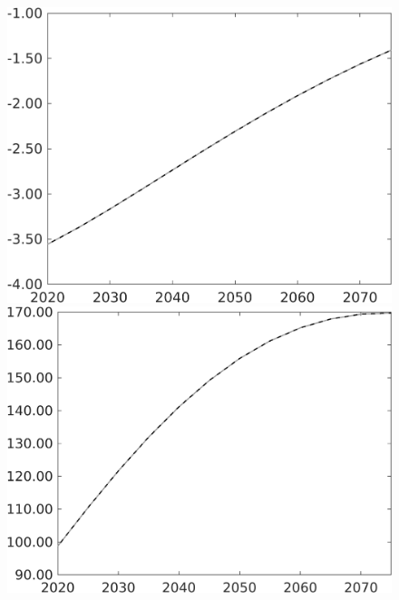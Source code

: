 \documentclass[12pt]{article}
\begin{document}
\begin{figure}[h!!]
\begin{minipage}[]{0.32\textwidth}
	\end{minipage}	
	\begin{minipage}[]{0.32\textwidth}
		\includegraphics[width=1\textwidth]{../../codding_model/own_basedOnFried/optimalPol_010922_revision/figures/all_13Sept22/PerdifNoTauf_Equlab_regime0_CompTaul_pn_spillover0_nsk1_xgr0_knspil1_sep1_LFlimit0_emsbase0_countec0_GovRev0_etaa0.79_lgd0.png}
	\end{minipage}	
\begin{minipage}[]{0.32\textwidth}
	\includegraphics[width=1\textwidth]{../../codding_model/own_basedOnFried/optimalPol_010922_revision/figures/all_13Sept22/PerdifNoTauf_Equlab_regime0_CompTaul_pepn_spillover0_nsk1_xgr0_knspil1_sep1_LFlimit0_emsbase0_countec0_GovRev0_etaa0.79_lgd0.png}

\end{minipage}
\end{figure}
\end{document}
